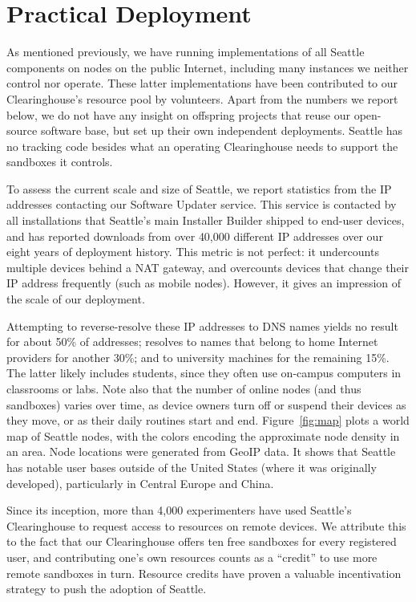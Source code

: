 \section{Practical Deployment}\label{sec-deployment}

As mentioned previously, we have running implementations of all
Seattle components on nodes on the public Internet, including
many instances we neither control nor operate. These latter
implementations have been
contributed to our Clearinghouse's resource pool by volunteers.
Apart from the numbers we report below, we do not have any
insight on offspring projects that reuse our open-source software
base, but set up their own independent deployments.
Seattle has no tracking code besides what an operating Clearinghouse
needs to support the sandboxes it controls.

To assess the current scale and size of Seattle, we report
statistics from the \gls{IP} addresses contacting our Software
Updater service. This service is contacted
by all installations that Seattle's main Installer Builder shipped
to end-user devices, and has reported downloads from over 40,000
different \gls{IP} addresses over our eight years of deployment history.
This metric is not perfect: it undercounts multiple devices behind
a \gls{NAT} gateway, and overcounts devices that change their
\gls{IP} address frequently (such as mobile nodes). However, it
gives an impression of the scale of our deployment.

Attempting to reverse-resolve these \gls{IP} addresses to \gls{DNS}
names yields no result for about 50\% of addresses; resolves to
names that belong to home Internet providers for another 30\%; and to university
machines for the remaining 15\%. The latter likely includes students, since they
often use on-campus computers in classrooms or labs. Note also that the number
of online nodes (and thus sandboxes) varies over time, as device owners
turn off or suspend their devices as they move, or as their daily
routines start and end.
Figure~\ref{fig:map} plots a world map of Seattle nodes, with the
colors encoding the approximate node density in an area.
Node locations were generated from GeoIP data.
It shows that Seattle has notable user bases outside of the
United States (where it was originally developed),
particularly in Central Europe and China.

Since its inception,
more than 4,000 experimenters have used Seattle's Clearinghouse
to request access to resources on remote devices. We attribute this
to the fact that our Clearinghouse offers ten free sandboxes for
every registered user, and contributing one's own resources counts
as a ``credit'' to use more remote sandboxes in turn.
Resource credits have proven a valuable incentivation strategy
to push the adoption of Seattle.

